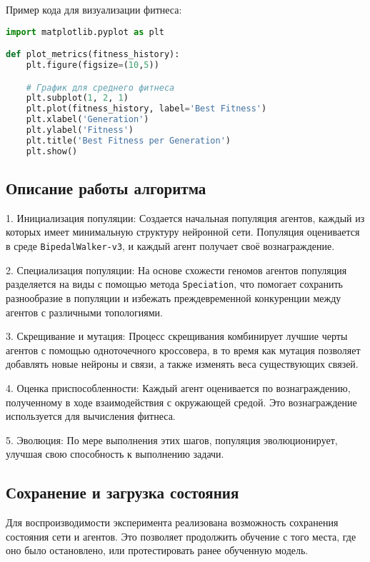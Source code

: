 \documentclass[a4paper,12pt]{article}
\begin{document}
Пример кода для визуализации фитнеса:

\begin{lstlisting}[language=Python]
import matplotlib.pyplot as plt

def plot_metrics(fitness_history):
    plt.figure(figsize=(10,5))

    # График для среднего фитнеса
    plt.subplot(1, 2, 1)
    plt.plot(fitness_history, label='Best Fitness')
    plt.xlabel('Generation')
    plt.ylabel('Fitness')
    plt.title('Best Fitness per Generation')
    plt.show()
\end{lstlisting}

\subsection{Описание работы алгоритма}

1. Инициализация популяции: Создается начальная популяция агентов, каждый из которых имеет минимальную структуру нейронной сети. Популяция оценивается в среде \texttt{BipedalWalker-v3}, и каждый агент получает своё вознаграждение.

2. Специализация популяции: На основе схожести геномов агентов популяция разделяется на виды с помощью метода \texttt{Speciation}, что помогает сохранить разнообразие в популяции и избежать преждевременной конкуренции между агентов с различными топологиями.

3. Скрещивание и мутация: Процесс скрещивания комбинирует лучшие черты агентов с помощью одноточечного кроссовера, в то время как мутация позволяет добавлять новые нейроны и связи, а также изменять веса существующих связей.

4. Оценка приспособленности: Каждый агент оценивается по вознаграждению, полученному в ходе взаимодействия с окружающей средой. Это вознаграждение используется для вычисления фитнеса.

5. Эволюция: По мере выполнения этих шагов, популяция эволюционирует, улучшая свою способность к выполнению задачи.

\subsection{Сохранение и загрузка состояния}

Для воспроизводимости эксперимента реализована возможность сохранения состояния сети и агентов. Это позволяет продолжить обучение с того места, где оно было остановлено, или протестировать ранее обученную модель.
\end{document}
